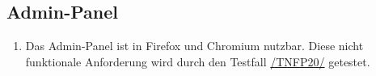 \subsection*{Admin-Panel}

\begin{samepage}
    \begin{enumerate}[label=\textbf{/NFP\arabic*0/}, align=left, start=2]
        \item \label{/NFP20/} Das \Gls{Admin-Panel} ist in \Gls{Firefox} und \Gls{Chromium} nutzbar. Diese nicht funktionale Anforderung wird durch den Testfall \hyperref[/TNFP20/]{/TNFP20/} getestet.
    \end{enumerate}
\end{samepage}